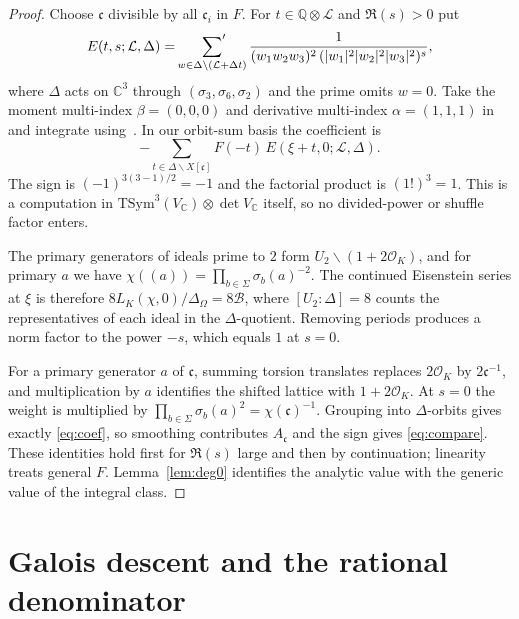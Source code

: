 \documentclass[11pt]{amsart}
\theoremstyle{remark}
\theoremstyle{definition}
\newcommand{\Q}{\mathbb{Q}}
\newcommand{\C}{\mathbb{C}}
\newcommand{\OK}{\mathcal{O}_K}
\newcommand{\TSym}{\mathrm{TSym}}
\newcommand{\Lat}{\mathcal{L}}
\newcommand{\Bn}{\mathcal{B}}
\begin{document}
\begin{proof}
Choose $\mathfrak c$ divisible by all $\mathfrak c_i$ in $F$. For $t\in\Q\otimes\Lat$ and $\Re(s)>0$ put
\[
E(t,s;\Lat,\Delta)=\sideset{}{'}\sum_{w\in\Delta\backslash(\Lat+\Delta t)}\frac{1}{(w_1w_2w_3)^2\,(|w_1|^2|w_2|^2|w_3|^2)^{s}},
\]
where $\Delta$ acts on $\C^3$ through $(\sigma_3,\sigma_6,\sigma_2)$ and the prime omits $w=0$. Take the moment multi-index $\beta=(0,0,0)$ and derivative multi-index $\alpha=(1,1,1)$ in~\cite[Prop.~3.23]{KS} and integrate using~\cite[Lemma~3.26]{KS}. In our orbit-sum basis the coefficient is
\begin{equation}\label{eq:coef}
-\sum_{t\in\Delta\backslash X[\mathfrak c]}F(-t)\,E(\xi+t,0;\Lat,\Delta).
\end{equation}
The sign is $(-1)^{3(3-1)/2}=-1$ and the factorial product is $(1!)^3=1$. This is a computation in $\TSym^3(V_\C)\otimes\det V_\C$ itself, so no divided-power or shuffle factor enters.

The primary generators of ideals prime to $2$ form $U_2\backslash(1+2\OK)$, and for primary $a$ we have $\chi((a))=\prod_{b\in\Sigma}\sigma_b(a)^{-2}$. The continued Eisenstein series at $\xi$ is therefore $8L_K(\chi,0)/\Delta_\Omega=8\Bn$, where $[U_2:\Delta]=8$ counts the representatives of each ideal in the $\Delta$-quotient. Removing periods produces a norm factor to the power $-s$, which equals $1$ at $s=0$.

For a primary generator $a$ of $\mathfrak c$, summing torsion translates replaces $2\OK$ by $2\mathfrak c^{-1}$, and multiplication by $a$ identifies the shifted lattice with $1+2\OK$. At $s=0$ the weight is multiplied by $\prod_{b\in\Sigma}\sigma_b(a)^2=\chi(\mathfrak c)^{-1}$. Grouping into $\Delta$-orbits gives exactly \eqref{eq:coef}, so smoothing contributes $A_{\mathfrak c}$ and the sign gives \eqref{eq:compare}. These identities hold first for $\Re(s)$ large and then by continuation; linearity treats general $F$. Lemma~\ref{lem:deg0} identifies the analytic value with the generic value of the integral class.
\end{proof}

\section{Galois descent and the rational denominator}\label{sec:descent}
\end{document}
